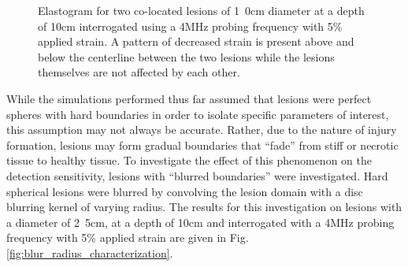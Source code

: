 			\begin{figure}[!t]
				\centering
				\caption[Elastogram for two co-located lesions]{Elastogram for two co-located lesions of \unit{1.0}{cm} diameter at a depth of \unit{10}{cm} interrogated using a \unit{4}{MHz} probing frequency with \unit{5}{\%} applied strain. A pattern of decreased strain is present above and below the centerline between the two lesions while the lesions themselves are not affected by each other.}
				\label{fig:separation_elastogram}
			\end{figure}

			While the simulations performed thus far assumed that lesions were perfect spheres with hard boundaries in order to isolate specific parameters of interest, this assumption may not always be accurate. Rather, due to the nature of injury formation, lesions may form gradual boundaries that ``fade'' from stiff or necrotic tissue to healthy tissue. To investigate the effect of this phenomenon on the detection sensitivity, lesions with ``blurred boundaries'' were investigated. Hard spherical lesions were blurred by convolving the lesion domain with a disc blurring kernel of varying radius. The results for this investigation on lesions with a diameter of \unit{2.5}{cm}, at a depth of \unit{10}{cm} and interrogated with a \unit{4}{MHz} probing frequency with \unit{5}{\%} applied strain are given in Fig. \ref{fig:blur_radius_characterization}.

